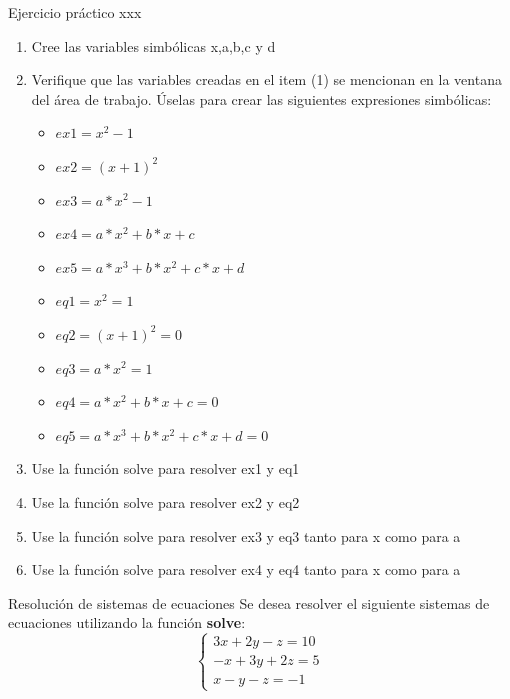 \documentclass{bredelebeamer}
\begin{document}
\begin{frame}{Ejercicio práctico xxx}
\begin{enumerate}
\item Cree las variables simbólicas x,a,b,c y d
\item Verifique que las variables creadas en el item (1) se mencionan en la ventana del área de trabajo. Úselas para crear las siguientes expresiones simbólicas:
\begin{itemize}
\item $ex1 = x^2-1$
\item $ex2 = (x+1)^2$
\item $ex3 = a*x^2-1$
\item $ex4 = a*x^2+b*x+c$
\item $ex5 = a*x^3+b*x^2+c*x+d$
\end{itemize}
\begin{itemize}
\item $eq1 = x^2=1$
\item $eq2 = (x+1)^2=0$
\item $eq3 = a*x^2=1$
\item $eq4 = a*x^2+b*x+c=0$
\item $eq5 = a*x^3+b*x^2+c*x+d=0$
\end{itemize}
\item Use la función solve para resolver ex1 y eq1
\item Use la función solve para resolver ex2 y eq2
\item Use la función solve para resolver ex3 y eq3 tanto para x como para a
\item Use la función solve para resolver ex4 y eq4 tanto para x como para a
\end{enumerate}
\end{frame}

\begin{frame}{Resolución de sistemas de ecuaciones}
Se desea resolver el siguiente sistemas de ecuaciones utilizando la función \textbf{solve}:
\begin{equation*}
\left\{\begin{matrix}
3x + 2y - z = 10  \\ 
-x +3y +2z = 5  \\ 
 x - y - z = -1 
\end{matrix}\right.
\end{equation*}
\end{frame}
\end{document}
